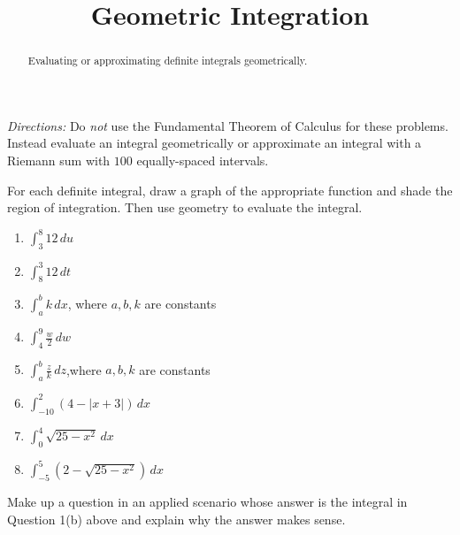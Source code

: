 \documentclass{ximera}
\title{Geometric Integration}
\begin{document}
\begin{abstract}
Evaluating or approximating definite integrals geometrically.
\end{abstract}
\maketitle


\emph{Directions:} Do \emph{not} use the Fundamental Theorem of Calculus for these problems. Instead evaluate an integral geometrically or approximate an integral with a Riemann sum with $100$ equally-spaced intervals.

\begin{question} \label{QOOOREfbxx3er}
For each definite integral, draw a graph of the appropriate function and shade the region of integration. Then use geometry to evaluate the integral.

\begin{enumerate}

\item $\int_3^8 12 \, du$

\item $\int_8^3 12 \, dt$

\item $\int_a^b k \, dx$, where $a,b,k$ are constants

\item $\int_4^9 \frac{w}{2} \, dw$

\item $\int_a^b \frac{z}{k} \, dz$,where $a,b,k$ are constants

\item $\int_{-10}^2 \left( 4-|x+3| \right) \, dx$

\item $\int_0^4 \sqrt{25-x^2}\, dx$

\item $\int_{-5}^5 \left( 2-\sqrt{25-x^2} \right)\, dx$

\end{enumerate} 
\end{question}

\begin{question}  \label{QPPlDlfe343421}
Make up a question in an applied scenario whose answer is the integral in Question 1(b) above and explain why the answer makes sense.
\end{question}
\end{document}
